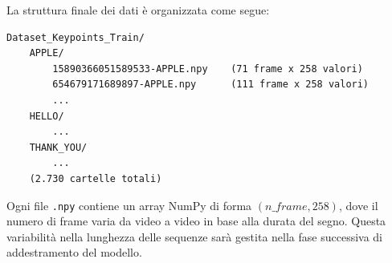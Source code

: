 La struttura finale dei dati è organizzata come segue:

\begin{lstlisting}[caption={Struttura delle cartelle di output}]
Dataset_Keypoints_Train/
    APPLE/
        15890366051589533-APPLE.npy    (71 frame x 258 valori)
        654679171689897-APPLE.npy      (111 frame x 258 valori)
        ...
    HELLO/
        ...
    THANK_YOU/
        ...
    (2.730 cartelle totali)
\end{lstlisting}

Ogni file \texttt{.npy} contiene un array NumPy di forma $(\textit{n\_frame}, 258)$, dove il numero di frame varia da video a video in base alla durata del segno. Questa variabilità nella lunghezza delle sequenze sarà gestita nella fase successiva di addestramento del modello.